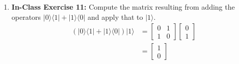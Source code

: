 \documentclass[main.tex]{subfiles}
\begin{document}
\begin{enumerate}
\item[] \textbf{In-Class Exercise 11:} Compute the matrix resulting from adding the operators $|0\rangle\langle 1|+| 1\rangle\langle 0|$ and apply that to $|1\rangle$.
    \begin{align*}
        \left(|0\rangle\langle 1|+| 1\rangle\langle 0|\right)|1\rangle  & = \left[\begin{array}{ll} 0 & 1 \\ 1 & 0 \end{array}\right]
                                                                        \left[\begin{array}{l}0\\1\end{array}\right]\\
                                                                        & = \left[\begin{array}{l}1\\0\end{array}\right] 
    \end{align*}


\end{enumerate}
\end{document}
